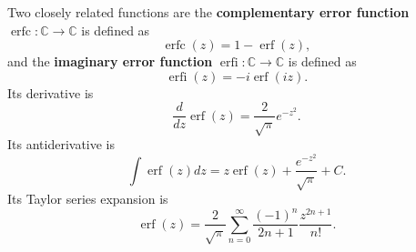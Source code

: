 Two closely related functions are the \textbf{complementary error function} $\operatorname{erfc}:\mathbb{C}\rightarrow\mathbb{C}$ is defined as
\begin{equation}
    \operatorname{erfc}(z)=1-\operatorname{erf}(z),
\end{equation}
and the \textbf{imaginary error function} $\operatorname{erfi}:\mathbb{C}\rightarrow\mathbb{C}$ is defined as 
\begin{equation}
    \operatorname{erfi}(z)=-i\operatorname{erf}(iz).
\end{equation}
Its derivative is 
\begin{equation}
    \frac{d}{dz}\operatorname{erf}(z)=\frac{2}{\sqrt{\pi}}e^{-z^2}.
\end{equation}
Its antiderivative is
\begin{equation}
    \int\operatorname{erf}(z)dz=z\operatorname{erf}(z)+\frac{e^{-z^2}}{\sqrt{\pi}}+C.
\end{equation}
Its Taylor series expansion is
\begin{equation}
    \operatorname{erf}(z)=\frac{2}{\sqrt{\pi}}\sum_{n=0}^{\infty}\frac{(-1)^n}{2n+1}\frac{z^{2n+1}}{n!}.
\end{equation}